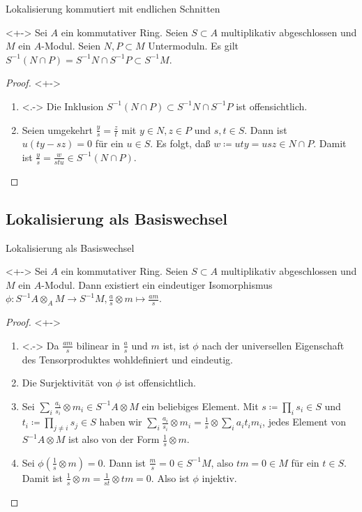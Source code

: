 \begin{frame}{Lokalisierung kommutiert mit endlichen Schnitten}
	\begin{proposition}<+->
		Sei \(A\) ein kommutativer Ring. Seien \(S \subset A\) multiplikativ abgeschlossen und
		\(M\) ein \(A\)-Modul. Seien \(N, P \subset M\) Untermoduln.
		Es gilt \(S^{-1} (N \cap P) = S^{-1} N \cap S^{-1} P \subset S^{-1} M\).
	\end{proposition}
	\begin{proof}<+->
		\begin{enumerate}[<+->]
		\item<.->
			Die Inklusion \(S^{-1} (N \cap P) \subset S^{-1} N \cap S^{-1} P\) ist offensichtlich.
		\item
			Seien umgekehrt \(\frac y s = \frac z t\) mit \(y \in N, z \in P\) und \(s, t \in S\). Dann
			ist \(u (t y - s z) = 0\) für ein \(u \in S\). Es folgt, daß  \(w \coloneqq uty = usz \in N \cap P\).
			Damit ist \(\frac y s = \frac w{stu} \in S^{-1} (N \cap P)\).
			\qedhere
		\end{enumerate}
	\end{proof}
\end{frame}

\subsection{Lokalisierung als Basiswechsel}

\begin{frame}{Lokalisierung als Basiswechsel}
	\begin{proposition}<+->
		Sei \(A\) ein kommutativer Ring. Seien \(S \subset A\) multiplikativ abgeschlossen und
		\(M\) ein \(A\)-Modul. Dann existiert ein eindeutiger Isomorphismus
		\(\phi \colon S^{-1} A \otimes_A M \to S^{-1} M, \frac a s \otimes m \mapsto \frac{am} s\).
	\end{proposition}
	\begin{proof}<+->
		\begin{enumerate}[<+->]
		\item<.->
			Da \(\frac{am}{s}\) bilinear in \(\frac a s\) und \(m\) ist, ist \(\phi\) nach der universellen
			Eigenschaft des Tensorproduktes wohldefiniert und eindeutig.
		\item
			Die Surjektivität von \(\phi\) ist offensichtlich.
		\item
			Sei \(\sum_i \frac{a_i}{s_i} \otimes m_i \in S^{-1} A \otimes M\) ein beliebiges Element.
			Mit \(s \coloneqq \prod_i s_i \in S\) und \(t_i \coloneqq \prod_{j \neq i} s_j \in S\) haben wir
			\(\sum_i \frac{a_i}{s_i} \otimes m_i = \frac 1 s \otimes \sum_i a_i t_i m_i\), jedes Element von
			\(S^{-1} A \otimes M\) ist also von der Form \(\frac 1 s \otimes m\).
		\item
			Sei \(\phi(\frac 1 s \otimes m) = 0\). Dann ist \(\frac m s = 0 \in S^{-1} M\), also \(t m = 0 \in M\) für ein \(t \in S\).
			Damit ist \(\frac 1 s \otimes m = \frac 1 {st} \otimes t m = 0\). Also ist
			\(\phi\) injektiv.
		\qedhere
		\end{enumerate}
	\end{proof}
\end{frame}

